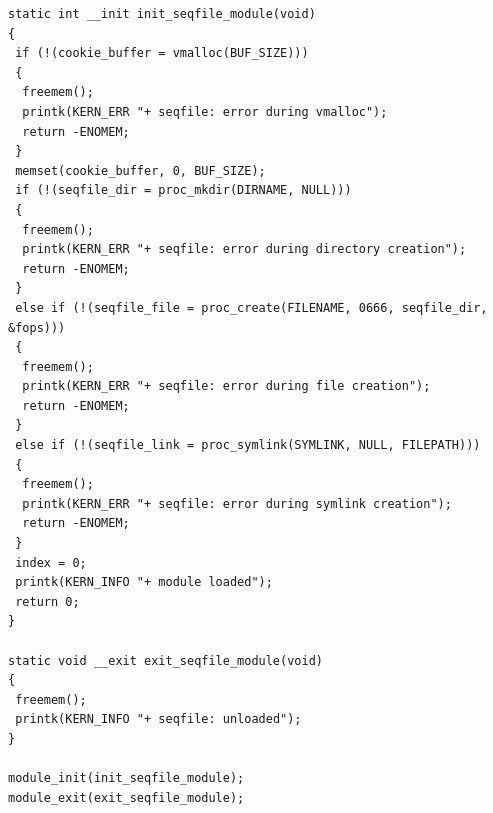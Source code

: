 \begin{lstlisting}
static int __init init_seqfile_module(void) 
{ 
 if (!(cookie_buffer = vmalloc(BUF_SIZE))) 
 {
  freemem();
  printk(KERN_ERR "+ seqfile: error during vmalloc");
  return -ENOMEM;
 }
 memset(cookie_buffer, 0, BUF_SIZE);
 if (!(seqfile_dir = proc_mkdir(DIRNAME, NULL))) 
 {
  freemem();
  printk(KERN_ERR "+ seqfile: error during directory creation");
  return -ENOMEM;
 } 
 else if (!(seqfile_file = proc_create(FILENAME, 0666, seqfile_dir, &fops))) 
 {
  freemem();
  printk(KERN_ERR "+ seqfile: error during file creation");
  return -ENOMEM;
 } 
 else if (!(seqfile_link = proc_symlink(SYMLINK, NULL, FILEPATH))) 
 {
  freemem();
  printk(KERN_ERR "+ seqfile: error during symlink creation");
  return -ENOMEM;
 }
 index = 0;
 printk(KERN_INFO "+ module loaded");
 return 0;
}

static void __exit exit_seqfile_module(void) 
{
 freemem();
 printk(KERN_INFO "+ seqfile: unloaded");
}

module_init(init_seqfile_module);
module_exit(exit_seqfile_module);
\end{lstlisting}


